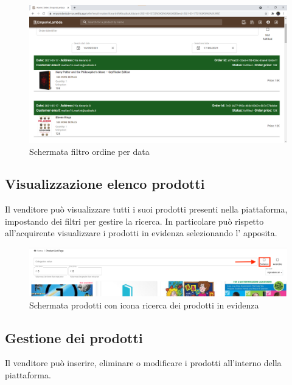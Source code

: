 \begin{figure}[H]
	\centering
	\includegraphics[scale=0.4]{Immagini/Venditore/Orders Date Filter.png}
	\caption{Schermata filtro ordine per data}
	\label{fig:OrdiniDataVend}
\end{figure}
\subsection{Visualizzazione elenco prodotti}
Il venditore può visualizzare tutti i suoi prodotti presenti nella piattaforma, impostando dei filtri per gestire la ricerca. In particolare può rispetto all'acquirente visualizzare i prodotti in evidenza selezionando l' apposita.
\begin{figure}[H]
	\centering
	\includegraphics[scale=0.25]{Immagini/Venditore/plp.seller.png}
	\caption{Schermata prodotti con icona ricerca dei prodotti in evidenza}
	\label{fig:ProdottiEvidenza}
\end{figure}
\subsection{Gestione dei prodotti}
Il venditore può inserire, eliminare o modificare i prodotti all'interno della piattaforma.
